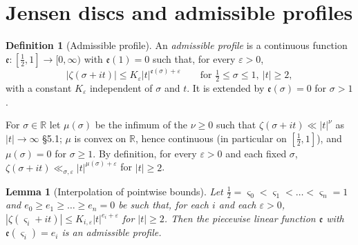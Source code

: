 \documentclass[11pt,reqno]{amsart}
\makeatletter
\let\CG@origcite\cite
\renewcommand*{\cite}[2][]{\def\CG@citekey{#2}%
  \ifx\relax#1\relax\CG@origcite{#2}\else\CG@origcite[#1]{#2}\fi}
\numberwithin{equation}{section}
\newtheorem{lemma}[theorem]{Lemma}
\theoremstyle{definition}
\newtheorem{definition}[theorem]{Definition}
\theoremstyle{remark}
\newcommand{\R}{\mathbb R}
\makeatother
\begin{document}
\section{Jensen discs and admissible profiles}\label{sec:jensen}

\begin{definition}[Admissible profile]\label{def:admissible}
An \emph{admissible profile} is a continuous function $\mathfrak e\colon[\frac12,1]\to[0,\infty)$ with $\mathfrak e(1)=0$ such that, for every $\varepsilon>0$,
\begin{equation}
|\zeta(\sigma+it)|\le K_\varepsilon|t|^{\mathfrak e(\sigma)+\varepsilon}\qquad\text{for }\tfrac12\le\sigma\le1,\ |t|\ge2,
\label{eq:admissible}
\end{equation}
with a constant $K_\varepsilon$ independent of $\sigma$ and $t$. It is extended by $\mathfrak e(\sigma)=0$ for $\sigma>1$.
\end{definition}

For $\sigma\in\R$ let $\mu(\sigma)$ be the infimum of the $\nu\ge0$ such that $\zeta(\sigma+it)\ll|t|^\nu$ as $|t|\to\infty$ \cite[\S5.1]{Titchmarsh1986}; $\mu$ is convex on $\R$, hence continuous (in particular on $[\frac12,1]$), and $\mu(\sigma)=0$ for $\sigma\ge1$. By definition, for every $\varepsilon>0$ and each fixed $\sigma$, $\zeta(\sigma+it)\ll_{\sigma,\varepsilon}|t|^{\mu(\sigma)+\varepsilon}$ for $|t|\ge2$.

\begin{lemma}[Interpolation of pointwise bounds]\label{lem:interpolation}
Let $\frac12=\varsigma_0<\varsigma_1<\dots<\varsigma_n=1$ and $e_0\ge e_1\ge\dots\ge e_n=0$ be such that, for each $i$ and each $\varepsilon>0$, $|\zeta(\varsigma_i+it)|\le K_{i,\varepsilon}|t|^{e_i+\varepsilon}$ for $|t|\ge2$. Then the piecewise linear function $\mathfrak e$ with $\mathfrak e(\varsigma_i)=e_i$ is an admissible profile.
\end{lemma}
\end{document}
